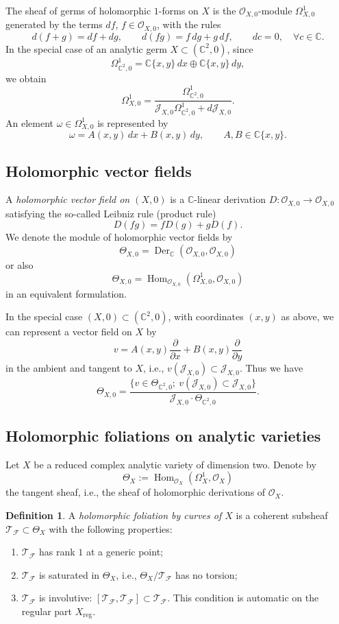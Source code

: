 \documentclass[11pt,twoside]{amsart}
\newcommand{\C}{\mathbb C}
\newcommand{\OO}{\mathcal O}
\newcommand{\F}{\mathcal F}
\newcommand{\J}{\mathcal J}
\newcommand{\T}{\mathcal T}
\DeclareMathOperator{\Hom}{Hom}
\DeclareMathOperator{\Der}{Der}
\theoremstyle{definition}
\newtheorem{defi}{Definition}
\begin{document}

The sheaf of germs of holomorphic $1$-forms on $X$ is the $\OO_{X,0}$-module $\Omega_{X,0}^1$ generated by the terms $df$, $f\in\OO_{X,0}$, with the rules
\[
d(f+g)=df+dg,
\qquad
 d(fg)=f\,dg+g\,df,
\qquad
 dc=0,
\quad \forall c\in\C.
\]
In the special case of an analytic germ $X\subset(\C^2,0)$, since
\[
\Omega_{\C^2,0}^1=\C\{x,y\}\,dx\oplus \C\{x,y\}\,dy,
\]
we obtain
\[
\Omega_{X,0}^1=\frac{\Omega_{\C^2,0}^1}{\J_{X,0}\Omega_{\C^2,0}^1+d\J_{X,0}}.
\]
An element $\omega\in\Omega_{X,0}^1$ is represented by
\[
\omega=A(x,y)\,dx+B(x,y)\,dy,
\qquad A,B\in\C\{x,y\}.
\]

\subsection{Holomorphic vector fields}

A \textit{holomorphic vector field on $(X,0)$} is a $\C$-linear derivation $D\colon\OO_{X,0}\to\OO_{X,0}$
satisfying the so-called Leibniz rule (product rule)
\[
D(fg)=fD(g)+gD(f).
\]
We denote the module of holomorphic vector fields by
\[
\Theta_{X,0}=\Der_\C(\OO_{X,0},\OO_{X,0})
\]
or also
\[
\Theta_{X,0}=\Hom_{\OO_{X,0}}(\Omega_{X,0}^1,\OO_{X,0})
\]
in an equivalent formulation.

In the special case $(X,0)\subset(\C^2,0)$, with coordinates $(x,y)$ as above, we can represent a vector field on $X$ by
\[
v=A(x,y)\frac{\partial}{\partial x}+B(x,y)\frac{\partial}{\partial y}
\]
in the ambient and tangent to $X$, i.e., $v(\J_{X,0})\subset\J_{X,0}$. Thus we have
\[
\Theta_{X,0}=\frac{\{v\in\Theta_{\C^2,0};\ v(\J_{X,0})\subset\J_{X,0}\}}{\J_{X,0}\cdot\Theta_{\C^2,0}}.
\]

\subsection{Holomorphic foliations on analytic varieties}

Let $X$ be a reduced complex analytic variety of dimension two. Denote by
\[
\Theta_X:=\Hom_{\OO_X}(\Omega_X^1,\OO_X)
\]
the tangent sheaf, i.e., the sheaf of holomorphic derivations of $\OO_X$.

\begin{defi}
A \textit{holomorphic foliation by curves of $X$} is a coherent subsheaf $\T_\F\subset\Theta_X$ with the following properties:
\begin{enumerate}
\item[(i)] $\T_\F$ has rank $1$ at a generic point;

\item[(ii)] $\T_\F$ is saturated in $\Theta_X$, i.e., $\Theta_X/\T_\F$ has no torsion;

\item[(iii)] $\T_\F$ is involutive: $[\T_\F,\T_\F]\subset\T_\F$. This condition is automatic on the regular part $X_{\mathrm{reg}}$.

\end{enumerate}
\end{defi}
\end{document}
